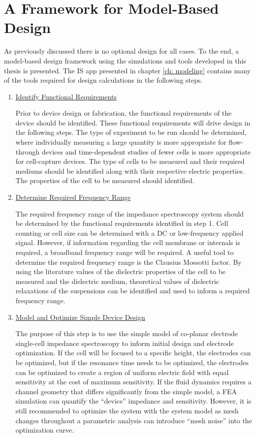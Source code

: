 \section{A Framework for Model-Based Design}

\par As previously discussed there is no optional design for all cases. To the end, a model-based design framework using the simulations and tools developed in this thesis is presented. The IS app presented in chapter \ref{ch: modeling} contains many of the tools required for design calculations in the following steps.

\begin{enumerate}
    \item \underline{Identify Functional Requirements}
    \par Prior to device design or fabrication, the functional requirements of the device should be identified. These functional requirements will drive design in the following steps. The type of experiment to be run should be determined, where individually measuring a large quantity is more appropriate for flow-through devices and time-dependent studies of fewer cells is more appropriate for cell-capture devices. The type of cells to be measured and their required mediums should be identified along with their respective electric properties. The properties of the cell to be measured should identified.
    
    \item \underline{Determine Required Frequency Range}
    \par The required frequency range of the impedance spectroscopy system should be determined by the functional requirements identified in step 1. Cell counting or cell size can be determined with a DC or low-frequency applied signal. However, if information regarding the cell membrane or internals is required, a broadband frequency range will be required. A useful tool to determine the required frequency range is the Clausius Mossotti factor. By using the literature values of the dielectric properties of the cell to be measured and the dielectric medium, theoretical values of dielectric relaxations of the suspensions can be identified and used to inform a required frequency range.
    
    \item \underline{Model and Optimize Simple Device Design}
    \par The purpose of this step is to use the simple model of co-planar electrode single-cell impedance spectroscopy to inform initial design and electrode optimization. If the cell will be focused to a specific height, the electrodes can be optimized, but if the resonance time needs to be optimized, the electrodes can be optimized to create a region of uniform electric field with equal sensitivity at the cost of maximum sensitivity. If the fluid dynamics requires a channel geometry that differs significantly from the simple model, a FEA simulation can quantify the “device” impedance and sensitivity.  However, it is still recommended to optimize the system with the system model as mesh changes throughout a parametric analysis can introduce “mesh noise” into the optimization curve. 


\end{enumerate}
